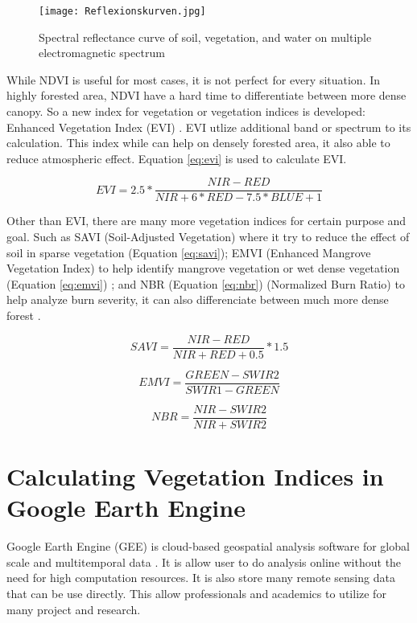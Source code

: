 \begin{figure}[htbp]
	\label{fig:spectralCurve}
	\centering
	\texttt{[image: Reflexionskurven.jpg]}
	\caption{Spectral reflectance curve of soil, vegetation, and water on multiple electromagnetic spectrum \cite{siegmund2005fernes}}
\end{figure}

While NDVI is useful for most cases, it is not perfect for every situation. In highly forested area, NDVI have a hard time to differentiate between more dense canopy. So a new index for vegetation or vegetation indices is developed: Enhanced Vegetation Index (EVI) \cite{huete2002overview}. EVI utlize additional band or spectrum to its calculation. This index while can help on densely forested area, it also able to reduce atmospheric effect. Equation \ref{eq:evi} is used to calculate EVI.

\begin{equation}
	\label{eq:evi}
	EVI = 2.5 * \frac{NIR - RED}{NIR + 6 * RED - 7.5 * BLUE + 1}
\end{equation}

Other than EVI, there are many more vegetation indices for certain purpose and goal. Such as SAVI (Soil-Adjusted Vegetation) where it try to reduce the effect of soil in sparse vegetation \cite{huete1988soil} (Equation \ref{eq:savi}); EMVI (Enhanced Mangrove Vegetation Index) to help identify mangrove vegetation or wet dense vegetation (Equation \ref{eq:emvi}) \cite{yang2022enhanced}; and NBR (Equation \ref{eq:nbr}) (Normalized Burn Ratio) to help analyze burn severity, it can also differenciate between much more dense forest \cite{escuin2008fire}.

\begin{equation}
	\label{eq:savi}
	SAVI = \frac{NIR - RED}{NIR + RED + 0.5} * 1.5
\end{equation}

\begin{equation}
	\label{eq:emvi}
	EMVI = \frac{GREEN - SWIR2}{SWIR1 - GREEN}
\end{equation}

\begin{equation}
	\label{eq:nbr}
	NBR = \frac{NIR - SWIR2}{NIR + SWIR2}
\end{equation}

\section{Calculating Vegetation Indices in Google Earth Engine}
Google Earth Engine (GEE) is cloud-based geospatial analysis software for global scale and multitemporal data \cite{gorelick2017google}. It is allow user to do analysis online without the need for high computation resources. It is also store many remote sensing data that can be use directly. This allow professionals and academics to utilize for many project and research.

